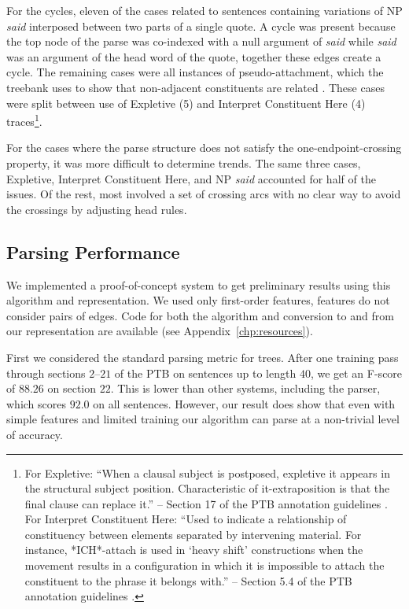 For the cycles, eleven of the cases related to sentences containing variations of NP \emph{said} interposed between two parts of a single quote.
A cycle was present because the top node of the parse was co-indexed with a null argument of \emph{said} while \emph{said} was an argument of the head word of the quote, together these edges create a cycle.
The remaining cases were all instances of pseudo-attachment, which the treebank uses to show that non-adjacent constituents are related \parencite{ptb-guide}.
These cases were split between use of Expletive (5) and Interpret Constituent Here (4) traces\footnote{
For Expletive: ``When a clausal subject is postposed, expletive it appears in the structural subject position.
Characteristic of it-extraposition is that the final clause can replace it.'' -- Section 17 of the PTB annotation guidelines \parencite{ptb-guide}. \\
For Interpret Constituent Here: ``Used to indicate a relationship of constituency between elements separated by intervening material.
For instance, *ICH*-attach is used in `heavy shift' constructions when the movement results in a configuration in which it is impossible to attach the constituent to the phrase it belongs with.'' -- Section 5.4 of the PTB annotation guidelines \parencite{ptb-guide}.
}.

For the cases where the parse structure does not satisfy the one-endpoint-crossing property, it was more difficult to determine trends.
The same three cases, Expletive, Interpret Constituent Here, and NP \emph{said} accounted for half of the issues.
Of the rest, most involved a set of crossing arcs with no clear way to avoid the crossings by adjusting head rules.

\subsection{Parsing Performance}

We implemented a proof-of-concept system to get preliminary results using this algorithm and representation.
We used only first-order features, \myie features do not consider pairs of edges.
Code for both the algorithm and conversion to and from our representation are available (see Appendix~\ref{chp:resources}).

First we considered the standard parsing metric for trees.
After one training pass through sections $2$--$21$ of the PTB on sentences up to length $40$, we get an F-score of $88.26$ on section $22$.
This is lower than other systems, including the \textcite{cck} parser, which scores $92.0$ on all sentences.
However, our result does show that even with simple features and limited training our algorithm can parse at a non-trivial level of accuracy.

